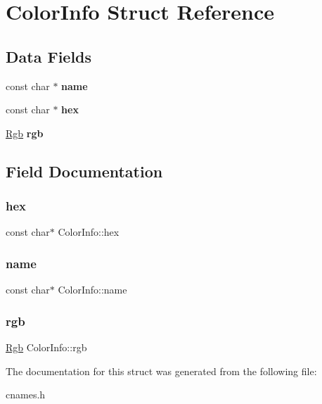 \hypertarget{struct_color_info}{}\section{Color\+Info Struct Reference}
\label{struct_color_info}
\subsection*{Data Fields}
\begin{DoxyCompactItemize}
\item 
\mbox{\label{struct_color_info_ace286a57c75f465113f3fa68800eb0ff}} 
const char $\ast$ {\bfseries name}
\item 
\mbox{\label{struct_color_info_a1cd69aeba7e0a78c70e775a19a88eab5}} 
const char $\ast$ {\bfseries hex}
\item 
\mbox{\label{struct_color_info_a088bdf4ce19ae9cc8200062159164dc8}} 
\hyperlink{struct_rgb}{Rgb} {\bfseries rgb}
\end{DoxyCompactItemize}


\subsection{Field Documentation}
\mbox{\label{struct_color_info_a1cd69aeba7e0a78c70e775a19a88eab5}} 
\subsubsection{\texorpdfstring{hex}{hex}}
{\footnotesize\ttfamily const char$\ast$ Color\+Info\+::hex}

\mbox{\label{struct_color_info_ace286a57c75f465113f3fa68800eb0ff}} 
\subsubsection{\texorpdfstring{name}{name}}
{\footnotesize\ttfamily const char$\ast$ Color\+Info\+::name}

\mbox{\label{struct_color_info_a088bdf4ce19ae9cc8200062159164dc8}} 
\subsubsection{\texorpdfstring{rgb}{rgb}}
{\footnotesize\ttfamily \hyperlink{struct_rgb}{Rgb} Color\+Info\+::rgb}



The documentation for this struct was generated from the following file\+:\begin{DoxyCompactItemize}
\item 
cnames.\+h\end{DoxyCompactItemize}
